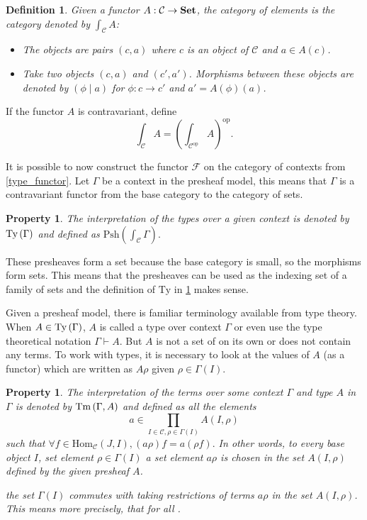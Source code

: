 \documentclass[12pt,a4paper,twoside,xetex]{book}
\newcommand{\keyword}[1]{\emph{#1}\index{#1}}
\newtheorem{definition}[theorem]{Definition}
\newtheorem{property}[theorem]{Property}
\newcommand{\Psh}[1]{\text{Psh}\left(#1\right)}
\newcommand{\coe}[2]{\int_{#1}{#2}}
\begin{document}
\begin{definition}
Given a functor $A:\mathcal{C} \rightarrow \text{\textbf{Set}}$, the \keyword{category of 
elements} is the category denoted by $\int_{\mathcal{C}} A$:

\begin{itemize}
\item The objects are pairs $(c,a)$ where $c$ is an object of $\mathcal{C}$ and 
$a\in A(c)$.
\item Take two objects $(c,a)$ and $(c',a')$. Morphisms between these objects 
are denoted by $(\phi \mid a)$ for $\phi : c \rightarrow c'$ and $a' = 
A(\phi)(a)$.
\end{itemize}
\end{definition}

If the functor $A$ is contravariant, define $$\coe{\mathcal{C}}{A} = 
\left(\coe{\mathcal{C}^{\text{op}}}{A} \right)^{\text{op}}.$$

It is possible to now construct the functor $\mathcal{F}$ on the category of 
contexts from \cref{type_functor}. Let $\Gamma$ be a context in the presheaf 
model, this means that $\Gamma$ is a contravariant functor from the base 
category to the category of sets. 

\begin{property}\label{prety}
The interpretation of the types over a given context is denoted by 
$\text{Ty}\left(\Gamma\right)$ and defined as $\Psh{\coe{\mathcal{C}}{\Gamma}}.$
\end{property}

These presheaves form a set because the base category is small, so the 
morphisms form sets. This means that the presheaves can be used as the indexing 
set of a family of sets and the definition of $\text{Ty}$ in \cref{prety} makes 
sense. 

Given a presheaf model, there is familiar terminology available from type 
theory. When $A \in \text{Ty}\left(\Gamma\right)$,  $A$ is called a type over context $\Gamma$ 
or even use the type theoretical notation $\Gamma \vdash A$. But $A$ is not a 
set of on its own or does not contain any terms. To work with types, it is 
necessary to look at the values of $A$ (as a functor) which are written as 
$A\rho$ given $\rho \in \Gamma (I)$.

\begin{property}\label{pretm}
The interpretation of the terms over some context $\Gamma$ and type $A$ in 
$\Gamma$ is denoted by  $\text{Tm}\left(\Gamma,A\right)$ and defined as all the elements $$a 
\in \prod _{I \in \mathcal{C}, \rho \in \Gamma (I)} A(I,\rho)$$ such that 
$\forall f \in \text{Hom}_{\mathcal{C}}(J,I), (a \rho )f = a(\rho f).$ In other 
words, to every base object $I$, set element $\rho \in \Gamma (I)$ a set 
element $a\rho$ is chosen in the set $A(I,\rho)$ defined by the given presheaf 
$A$. 

the set $\Gamma (I)$ commutes with taking restrictions of terms $a \rho$ in the 
set $A(I, \rho )$. This means more precisely, that for all .
\end{property}
\end{document}

